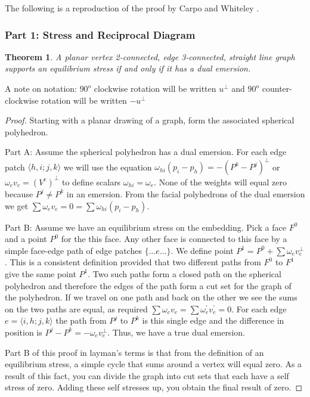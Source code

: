 \documentclass[11pt]{article}
\newtheorem{theorem}{Theorem}[section]
\theoremstyle{definition}
\newtheorem{definition}{Definition}[section]
\begin{document}
	The following is a reproduction of the proof by Carpo and Whiteley \cite{mccProof}.
	
\subsubsection{Part 1: Stress and Reciprocal Diagram}
	
	\begin{theorem}
		A planar vertex 2-connected, edge 3-connected, straight line graph supports an equilibrium stress if and only if it has a dual emersion.
	\end{theorem}
	
	A note on notation: $90^o$ clockwise rotation will be written $u^\bot$ and $90^o$ counter-clockwise rotation will be written $-u^\bot$
	
	\begin{proof}
		Starting with a planar drawing of a graph, form the associated spherical polyhedron.
		
		Part A: Assume the spherical polyhedron has a dual emersion.
		For each edge patch $\langle h,i;j,k \rangle$ we will use the equation $\omega_{hi}(p_i - p_h) = -(P^k - P^j)^\bot$ or $\omega_ev_e = (V^e)^\bot$ to define scalars $\omega_{hi} = \omega_e$. 
		None of the weights will equal zero because $P^j \neq P^k$ in an emersion. 
		From the facial polyhedrons of the dual emersion we get $\sum\omega_ev_e = 0 = \sum\omega_{hi}(p_i - p_h)$.

		Part B: Assume we have an equilibrium stress on the embedding.
		Pick a face $F^0$ and a point $P^0$ for the this face. 
		Any other face is connected to this face by a simple face-edge path of edge patches $\{...e...\}$. 
		We define point $P^1 = P^0 + \sum\omega_ev_e^\bot$. 
		This is a consistent definition provided that two different paths from $F^0$ to $F^1$ give the same point $P^1$. 
		Two such paths form a closed path on the spherical polyhedron and therefore the edges of the path form a cut set for the graph of the polyhedron. 
		If we travel on one path and back on the other we see the sums on the two paths are equal, as required $\sum\omega_ev_e = \sum\omega_e^{'}v_e^{'} = 0$. 
		For each edge $e = \langle i,h;j,k \rangle$ the path from $P^j$ to $P^k$ is this single edge and the difference in position is $P^j - P^k = -\omega_ev_e^\bot$. 
		Thus, we have a true dual emersion.

		Part B of this proof in layman's terms is that from the definition of an equilibrium stress, a simple cycle that sums around a vertex will equal zero. 
		As a result of this fact, you can divide the graph into cut sets that each have a self stress of zero. 
		Adding these self stresses up, you obtain the final result of zero.
	\end{proof}
	
\end{document}
